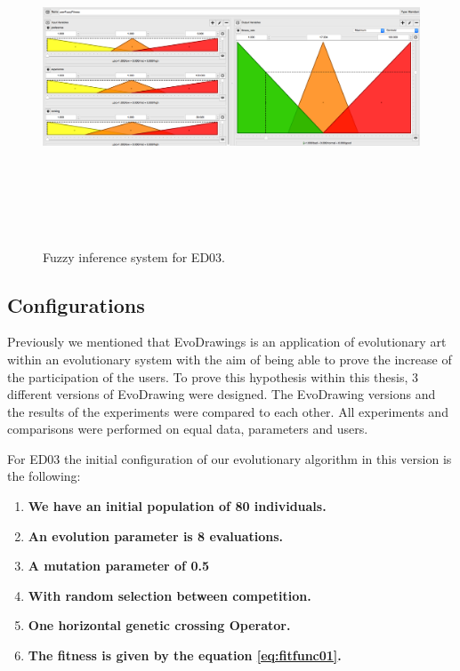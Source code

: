 \begin{figure}
\captionsetup{justification=centering,margin=2cm}
\centering
\setlength\fboxsep{0pt}
\setlength\fboxrule{0.7pt}
\includegraphics[width=12cm,height=10cm,keepaspectratio]{img/fuzzySys.png}
\caption{Fuzzy inference system for ED03.}
\label{fig:fis_02}
\end{figure}


\subsection{Configurations}

Previously we mentioned that EvoDrawings is an application of evolutionary art
within an evolutionary system with the aim of being able to prove the increase
of the participation of the users. To prove this hypothesis within this thesis,
3 different versions of EvoDrawing were designed. The EvoDrawing versions and
the results of the experiments were compared to each other. All experiments and
comparisons were performed on equal data, parameters and users.

For ED03 the initial configuration of our evolutionary algorithm in this version
is the following:

\begin{enumerate}
	\item  \textbf{We have an initial population of 80 individuals.}

	\item  \textbf{An evolution parameter is 8 evaluations.}

	\item  \textbf{A mutation parameter of 0.5}
	\item  \textbf{With random selection between competition.}
	\item  \textbf{One horizontal genetic crossing Operator.}
	\item  \textbf{The fitness is given by the equation \ref{eq:fitfunc01}.}
\end{enumerate}

